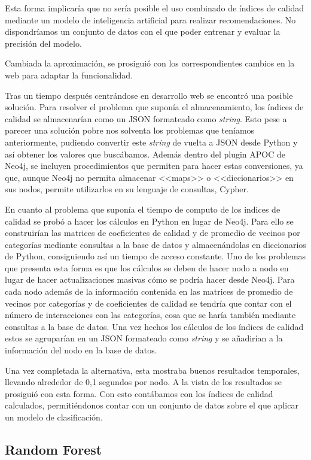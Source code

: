 Esta forma implicaría que no sería posible el uso combinado de índices de calidad mediante un modelo de inteligencia artificial para realizar recomendaciones. No dispondríamos un conjunto de datos con el que poder entrenar y evaluar la precisión del modelo.

Cambiada la aproximación, se prosiguió con los correspondientes cambios en la web para adaptar la funcionalidad.

Tras un tiempo después centrándose en desarrollo web se encontró una posible solución. Para resolver el problema que suponía el almacenamiento, los índices de calidad se almacenarían como un JSON formateado como \textit{string}. Esto pese a parecer una solución pobre nos solventa los problemas que teníamos anteriormente, pudiendo convertir este \textit{string} de vuelta a JSON desde Python y así obtener los valores que buscábamos. Además dentro del plugin APOC de Neo4j, se incluyen procedimientos que permiten para hacer estas conversiones, ya que, aunque Neo4j no permita almacenar <<maps>> o <<diccionarios>> en sus nodos, permite utilizarlos en su lenguaje de consultas, Cypher.

En cuanto al problema que suponía el tiempo de computo de los indices de calidad se probó a hacer los cálculos en Python en lugar de Neo4j. Para ello se construirían las matrices de coeficientes de calidad y de promedio de vecinos por categorías mediante consultas a la base de datos y almacenándolas en diccionarios de Python, consiguiendo así un tiempo de acceso constante. Uno de los problemas que presenta esta forma es que los cálculos se deben de hacer nodo a nodo en lugar de hacer actualizaciones masivas cómo se podría hacer desde Neo4j. Para cada nodo además de la información contenida en las matrices de promedio de vecinos por categorías y de coeficientes de calidad se tendría que contar con el número de interacciones con las categorías, cosa que se haría también mediante consultas a la base de datos. Una vez hechos los cálculos de los índices de calidad estos se agruparían en un JSON formateado como \textit{string} y se añadirían a la información del nodo en la base de datos.

Una vez completada la alternativa, esta mostraba buenos resultados temporales, llevando alrededor de 0,1 segundos por nodo. A la vista de los resultados se prosiguió con esta forma. Con esto contábamos con los índices de calidad calculados,
permitiéndonos contar con un conjunto de datos sobre el que aplicar un modelo de clasificación.

\subsection{Random Forest}


